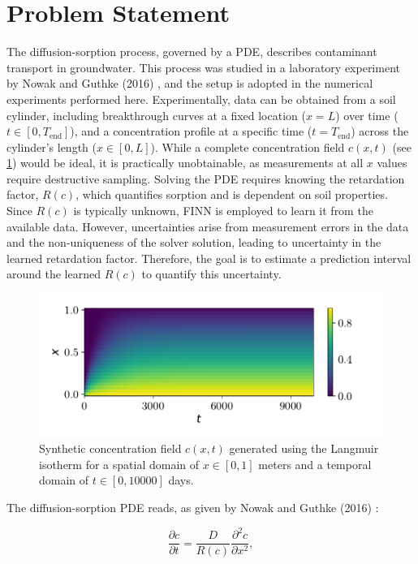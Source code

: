 \section{Problem Statement}
The diffusion-sorption process, governed by a PDE, describes contaminant transport in groundwater. This process was studied in a laboratory experiment by Nowak and Guthke (2016) \cite{nowak}, and the setup is adopted in the numerical experiments performed here. Experimentally, data can be obtained from a soil cylinder, including breakthrough curves at a fixed location ($x=L$) over time ($t \in [0, T_{\text{end}}]$), and a concentration profile at a specific time ($t=T_{\text{end}}$) across the cylinder's length ($x \in [0,L]$). While a complete concentration field $c(x,t)$ (see \cref{fig:c_diss_field_full}) would be ideal, it is practically unobtainable, as measurements at all $x$ values require destructive sampling. Solving the PDE requires knowing the retardation factor, $R(c)$, which quantifies sorption and is dependent on soil properties. Since $R(c)$ is typically unknown, FINN is employed to learn it from the available data. However, uncertainties arise from measurement errors in the data and the non-uniqueness of the solver solution, leading to uncertainty in the learned retardation factor. Therefore, the goal is to estimate a prediction interval around the learned $R(c)$ to quantify this uncertainty.

\begin{figure}[h]
    \centering
    \includegraphics{figs/c_diss_field_full.pdf}
    \caption{Synthetic concentration field $c(x,t)$ generated using the Langmuir isotherm for a spatial domain of $x \in [0, 1]$ meters and a temporal domain of $t \in [0, 10000]$ days.}
    \label{fig:c_diss_field_full}
\end{figure}


The diffusion-sorption PDE reads, as given by Nowak and Guthke (2016) \cite{nowak}:

\begin{equation}
    \frac{\partial c}{\partial t} = \frac{D}{R(c)} \frac{\partial^2 c}{\partial x^2},
    \label{eq:diff-sorpt-pde}
\end{equation}

